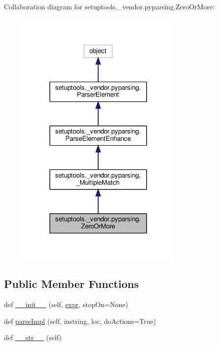 Collaboration diagram for setuptools.\+\_\+vendor.\+pyparsing.\+Zero\+Or\+More\+:
\nopagebreak
\begin{figure}[H]
\begin{center}
\leavevmode
\includegraphics[width=227pt]{classsetuptools_1_1__vendor_1_1pyparsing_1_1ZeroOrMore__coll__graph}
\end{center}
\end{figure}
\subsection*{Public Member Functions}
\begin{DoxyCompactItemize}
\item 
def \hyperlink{classsetuptools_1_1__vendor_1_1pyparsing_1_1ZeroOrMore_a337db3762bba43f517e360a7d1ddd612}{\+\_\+\+\_\+init\+\_\+\+\_\+} (self, \hyperlink{classsetuptools_1_1__vendor_1_1pyparsing_1_1ParseElementEnhance_a445450bd765a74cc1d1567e40cade40d}{expr}, stop\+On=None)
\item 
def \hyperlink{classsetuptools_1_1__vendor_1_1pyparsing_1_1ZeroOrMore_a5e30b20e2222b161e02ab007a6ba65fb}{parse\+Impl} (self, instring, loc, do\+Actions=True)
\item 
def \hyperlink{classsetuptools_1_1__vendor_1_1pyparsing_1_1ZeroOrMore_abda7d841e67ba2c6a087539a4c0542d3}{\+\_\+\+\_\+str\+\_\+\+\_\+} (self)
\end{DoxyCompactItemize}
